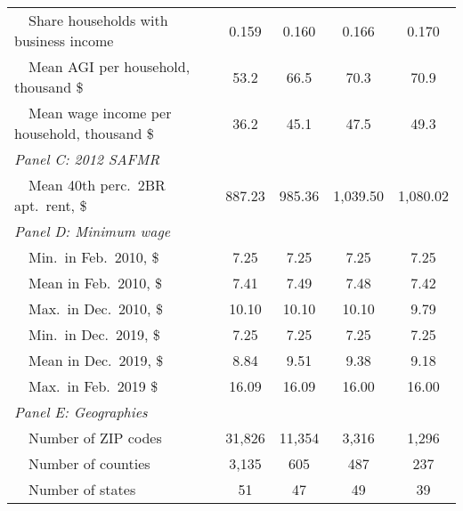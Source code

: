 \begin{landscape}
\begin{table}[hbt!]
\begin{tabular}{@{}lcccc@{}}
        $\quad$Share households with business income        & 0.159    & 0.160   & 0.166   & 0.170          \\
        $\quad$Mean AGI per household, thousand \$          & 53.2 & 66.5 & 70.3 & 70.9     \\
        $\quad$Mean wage income per household, thousand \$  & 36.2 & 45.1 & 47.5 & 49.3     \\
        \textit{Panel C: 2012 SAFMR}                        &       &       &        &               \\
        $\quad$Mean 40th perc.\ 2BR apt.\ rent, \$          & 887.23   & 985.36  & 1,039.50  & 1,080.02          \\
        \textit{Panel D: Minimum wage}                       &       &       &        &              \\
        $\quad$Min.\ in Feb.\ 2010, \$                      & 7.25   & 7.25  & 7.25  & 7.25         \\
        $\quad$Mean in Feb.\ 2010, \$                       & 7.41   & 7.49  & 7.48  & 7.42         \\
        $\quad$Max.\ in Dec.\ 2010, \$                      & 10.10   & 10.10  & 10.10  & 9.79         \\
        $\quad$Min.\ in Dec.\ 2019, \$                      & 7.25   & 7.25  & 7.25  & 7.25         \\
        $\quad$Mean in Dec.\ 2019, \$                       & 8.84   & 9.51  & 9.38  & 9.18         \\
        $\quad$Max.\ in Feb.\ 2019 \$                       & 16.09   & 16.09  & 16.00  & 16.00         \\
        \textit{Panel E: Geographies}                       &       &       &        &               \\
        $\quad$Number of ZIP codes                          & 31,826  & 11,354 & 3,316 & 1,296             \\
        $\quad$Number of counties                           & 3,135  & 605 & 487 & 237             \\
        $\quad$Number of states                             & 51  & 47 & 49 & 39             \\ \bottomrule
    \end{tabular}


\end{table}
\end{landscape}
